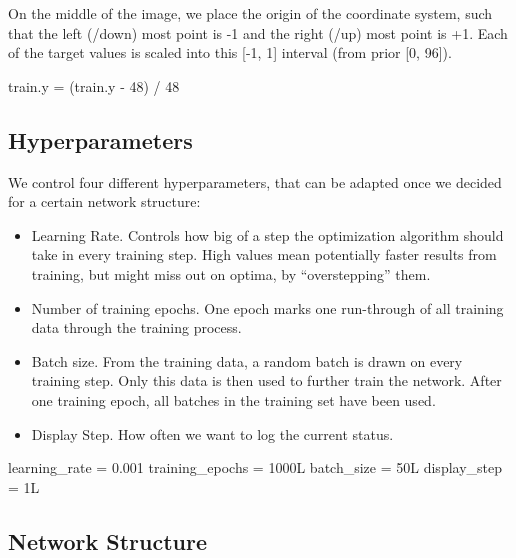 \documentclass[]{article}
\newenvironment{Shaded}{\begin{snugshade}}{\end{snugshade}}
\newcommand{\DecValTok}[1]{\textcolor[rgb]{0.00,0.00,0.81}{{#1}}}
\newcommand{\FloatTok}[1]{\textcolor[rgb]{0.00,0.00,0.81}{{#1}}}
\newcommand{\StringTok}[1]{\textcolor[rgb]{0.31,0.60,0.02}{{#1}}}
\newcommand{\NormalTok}[1]{{#1}}
\providecommand{\tightlist}{%
  \setlength{\itemsep}{0pt}\setlength{\parskip}{0pt}}
\begin{document}
On the middle of the image, we place the origin of the coordinate
system, such that the left (/down) most point is -1 and the right (/up)
most point is +1. Each of the target values is scaled into this {[}-1,
1{]} interval (from prior {[}0, 96{]}).

\begin{Shaded}
\begin{Highlighting}[]
\NormalTok{train.y =}\StringTok{ }\NormalTok{(train.y -}\StringTok{ }\DecValTok{48}\NormalTok{) /}\StringTok{ }\DecValTok{48}
\end{Highlighting}
\end{Shaded}

\subsection{Hyperparameters}\label{hyperparameters}

We control four different hyperparameters, that can be adapted once we
decided for a certain network structure:

\begin{itemize}
\tightlist
\item
  Learning Rate. Controls how big of a step the optimization algorithm
  should take in every training step. High values mean potentially
  faster results from training, but might miss out on optima, by
  ``overstepping'' them.
\item
  Number of training epochs. One epoch marks one run-through of all
  training data through the training process.
\item
  Batch size. From the training data, a random batch is drawn on every
  training step. Only this data is then used to further train the
  network. After one training epoch, all batches in the training set
  have been used.
\item
  Display Step. How often we want to log the current status.
\end{itemize}

\begin{Shaded}
\begin{Highlighting}[]
\NormalTok{learning_rate =}\StringTok{ }\FloatTok{0.001}
\NormalTok{training_epochs =}\StringTok{ }\NormalTok{1000L}
\NormalTok{batch_size =}\StringTok{ }\NormalTok{50L}
\NormalTok{display_step =}\StringTok{ }\NormalTok{1L}
\end{Highlighting}
\end{Shaded}

\subsection{Network Structure}\label{network-structure}
\end{document}
